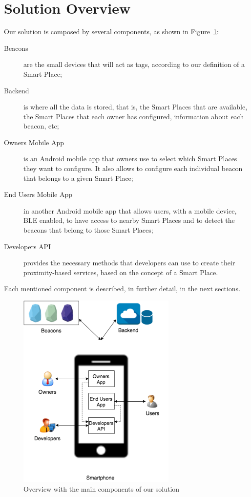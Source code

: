 \section{Solution Overview}
\label{sec:solution_solution_overview}
Our solution is composed by several components, as shown in Figure~\ref{fig:solution_overview}:
\begin{description}
  \item[Beacons] are the small devices that will act as tags, according to our definition of a Smart Place;
  \item[Backend] is where all the data is stored, that is, the Smart Places that are available, the Smart Places that each owner has configured, information about each beacon, etc;
  \item[Owners Mobile App] is an Android mobile app that owners use to select which Smart Places they want to configure. It also allows to configure each individual beacon that belongs to a given Smart Place;
  \item[End Users Mobile App] in another Android mobile app that allows users, with a mobile device, \gls{BLE} enabled, to have access to nearby Smart Places and to detect the beacons that belong to those Smart Places;
  \item[Developers \gls{API}] provides the necessary methods that developers can use to create their proximity-based services, based on the concept of a Smart Place.
\end{description}
Each mentioned component is described, in further detail, in the next sections.

\begin{figure}[!ht]
  \centering
    \includegraphics[width=0.7\textwidth, keepaspectratio]{images/smart_places_solution_overview}
    \caption[Solution Overview]{Overview with the main components of our solution}
    \label{fig:solution_overview}
\end{figure}

